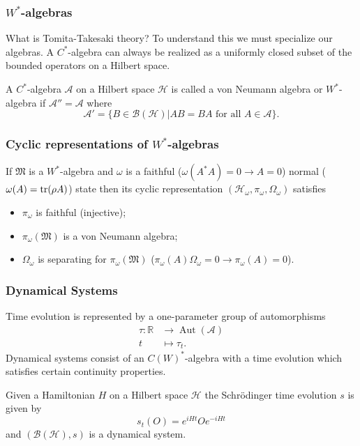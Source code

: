 \documentclass{beamer}
\DeclareMathOperator{\Aut}{Aut}
\begin{document}
\begin{frame}
	\frametitle{$W^*$-algebras}
	What is Tomita-Takesaki theory? To understand this we must specialize our algebras. A $C^*$-algebra can always be realized as a uniformly closed subset of the bounded operators on a Hilbert space\cite{Bratteli1987}. 
	\begin{definition}
		A $C^*$-algebra $\mathcal{A}$ on a Hilbert space $\mathcal{H}$ is called a von Neumann algebra or $W^*$-algebra if $\mathcal{A}''=\mathcal{A}$ where 
		\begin{equation}
			\mathcal{A}'=\{B\in\mathcal{B}(\mathcal{H})|AB=BA\text{ for all }A\in\mathcal{A}\}.
		\end{equation}
	\end{definition}
\end{frame}

\begin{frame}
\frametitle{Cyclic representations of $W^*$-algebras}
\begin{theorem}[$\bigstar$]
If $\mathfrak{M}$ is a $W^*$-algebra and $\omega$ is a faithful ($\omega(A^*A)=0\rightarrow A=0$) normal ($\omega(A)=\tr(\rho A)$) state then its cyclic representation $(\mathcal{H}_\omega,\pi_\omega,\Omega_\omega)$ satisfies
\begin{itemize}
	\item $\pi_\omega$ is faithful (injective);
	\item $\pi_\omega(\mathfrak{M})$ is a von Neumann algebra;
	\item $\Omega_\omega$ is separating for $\pi_\omega(\mathfrak{M})$ ($\pi_\omega(A)\Omega_\omega=0\rightarrow\pi_\omega(A)=0$).
\end{itemize}
\end{theorem}
\end{frame}

\begin{frame}
	\frametitle{Dynamical Systems}
	Time evolution is represented by a one-parameter group of automorphisms
	\begin{align*}
		\tau:\mathbb{R}&\rightarrow\Aut(\mathcal{A}) \\
		t&\mapsto\tau_t.
	\end{align*}
	Dynamical systems consist of an $C(W)^*$-algebra with a time evolution which satisfies certain continuity properties.
	\begin{example}
	Given a Hamiltonian $H$ on a Hilbert space $\mathcal{H}$ the Schrödinger time evolution $s$ is given by
	\begin{equation}
	s_t(O)=e^{iHt}O e^{-iHt}
	\end{equation}
	and $(\mathcal{B}(\mathcal{H}),s)$ is a dynamical system.
	\end{example}
\end{frame}
\end{document}
